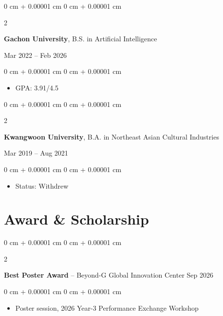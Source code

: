 \documentclass[10pt, letterpaper]{article}
\newenvironment{highlights}{
    \begin{itemize}[
        topsep=0.10 cm,
        parsep=0.10 cm,
        partopsep=0pt,
        itemsep=0pt,
        leftmargin=0 cm + 10pt
    ]
}{
    \end{itemize}
} %
\newenvironment{onecolentry}{
    \begin{adjustwidth}{
        0 cm + 0.00001 cm
    }{
        0 cm + 0.00001 cm
    }
}{
    \end{adjustwidth}
} %
\newenvironment{twocolentry}[2][]{
    \onecolentry
    \def\secondColumn{#2}
    \setcolumnwidth{\fill, 4.5 cm}
    \begin{paracol}{2}
}{
    \switchcolumn \raggedleft \secondColumn
    \end{paracol}
    \endonecolentry
} %
\begin{document}
        \begin{twocolentry}{
            Mar 2022 – Feb 2026
        }
            \textbf{Gachon University}, B.S. in Artificial Intelligence
        \end{twocolentry}
        \vspace{0.10 cm}
        \begin{onecolentry}
            \begin{highlights}
                \item GPA: 3.91/4.5 
            \end{highlights}
        \end{onecolentry}

        \begin{twocolentry}{
            Mar 2019 – Aug 2021
        }
            \textbf{Kwangwoon University}, B.A. in Northeast Asian Cultural Industries
        \end{twocolentry}
        
        \vspace{0.10 cm}
        \begin{onecolentry}
            \begin{highlights}
                \item Status: Withdrew
            \end{highlights}
        \end{onecolentry}


    
    \section{Award \& Scholarship}
        
        \begin{twocolentry}{
            Sep 2026
        }
            \textbf{Best Poster Award} -- Beyond-G Global Innovation Center\end{twocolentry}
        \vspace{0.10 cm}
        \begin{onecolentry}
            \begin{highlights}
                \item Poster session, 2026 Year-3 Performance Exchange Workshop
            \end{highlights}
        \end{onecolentry}
        \vspace{0.2 cm}
        
\end{document}
